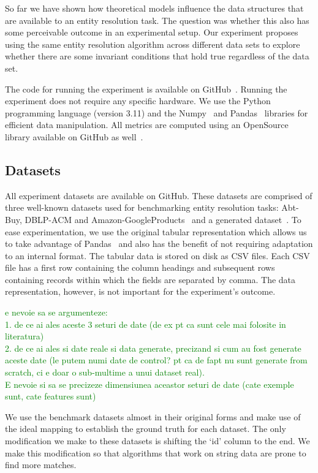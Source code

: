So far we have shown how theoretical models influence the data structures
that are available to an entity resolution task.
The question was whether this also has some perceivable outcome in an
experimental setup.
Our experiment proposes using the same entity resolution algorithm across
different data sets to explore whether there are some invariant conditions
that hold true regardless of the data set.

The code for running the experiment is available on GitHub~\cite{matchescu}.
Running the experiment does not require any specific hardware.
We use the Python~\cite{python} programming language (version 3.11) and the
Numpy~\cite{numpy} and Pandas~\cite{pandas2023} libraries for efficient
data manipulation.
All metrics are computed using an OpenSource library available on GitHub as
well~\cite{matchescu-er-metrics2023}.

\subsection{Datasets}\label{subsec:data}

All experiment datasets are available on GitHub\cite{expdata2023}.
These datasets are comprised of three well-known datasets used for
benchmarking entity resolution tasks: Abt-Buy, DBLP-ACM and
Amazon-GoogleProducts~\cite{vldb2010} and a generated dataset~\cite{expdata2023}.
To ease experimentation, we use the original tabular representation
which allows us to take advantage of Pandas~\cite{pandas2010,pandas2023}
and also has the benefit of not requiring adaptation to an internal format.
The tabular data is stored on disk as CSV files.
Each CSV file has a first row containing the column headings and subsequent
rows containing records within which the fields are separated by comma.
The data representation, however, is not important for the experiment's
outcome.

\textcolor{green}{e nevoie sa se argumenteze:\\
1. de ce ai ales aceste 3 seturi de date (de ex pt ca sunt cele mai folosite in literatura)\\
2. de ce ai ales si date reale si data generate, precizand si cum au fost generate aceste date (le putem numi date de control? pt ca de fapt nu sunt generate from scratch, ci e doar o sub-multime a unui dataset real).\\
E nevoie si sa se precizeze dimensiunea aceastor seturi de date (cate exemple sunt, cate features sunt)}

We use the benchmark datasets almost in their original forms and make use
of the ideal mapping to establish the ground truth for each dataset.
The only modification we make to these datasets is shifting the `id' column
to the end.
We make this modification so that algorithms that work on string data are prone
to find more matches.


